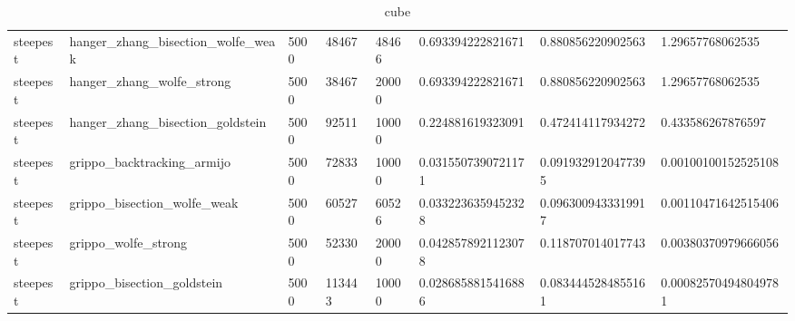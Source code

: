 \documentclass[a4paper,11pt]{article}
\numberwithin{equation}{section} %
\begin{document}
\begin{table}[h!]
{\begin{tabular}{|l|l|l|l|l|l|l|l|}
        steepest & hanger\_zhang\_bisection\_wolfe\_weak & 5000 & 48467 & 48466 & 0.693394222821671 & 0.880856220902563 & 1.29657768062535 \\
        steepest & hanger\_zhang\_wolfe\_strong & 5000 & 38467 & 20000 & 0.693394222821671 & 0.880856220902563 & 1.29657768062535 \\
        steepest & hanger\_zhang\_bisection\_goldstein & 5000 & 92511 & 10000 & 0.224881619323091 & 0.472414117934272 & 0.433586267876597 \\
        steepest & grippo\_backtracking\_armijo & 5000 & 72833 & 10000 & 0.0315507390721171 & 0.0919329120477395 & 0.00100100152525108 \\
        steepest & grippo\_bisection\_wolfe\_weak & 5000 & 60527 & 60526 & 0.0332236359452328 & 0.0963009433319917 & 0.00110471642515406 \\
        steepest & grippo\_wolfe\_strong & 5000 & 52330 & 20000 & 0.0428578921123078 & 0.118707014017743 & 0.00380370979666056 \\
        steepest & grippo\_bisection\_goldstein & 5000 & 113443 & 10000 & 0.0286858815416886 & 0.0834445284855161 & 0.000825704948049781 \\
\end{tabular}}
\caption{cube}
\label{table:cube}
\end{table}
\end{document}
